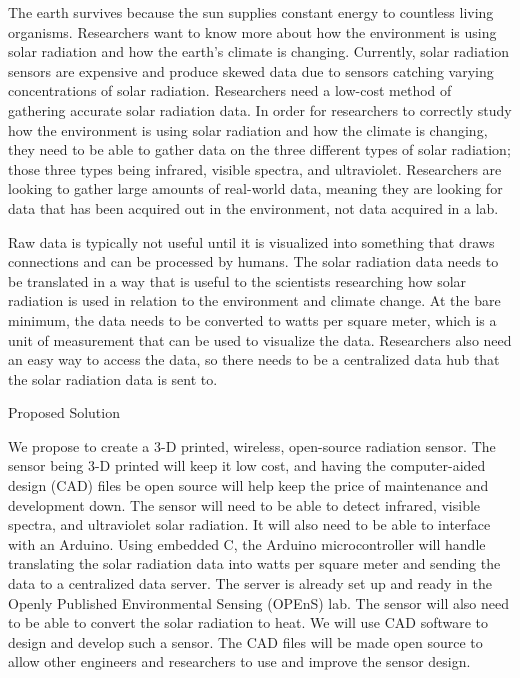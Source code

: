 \documentclass[10pt,draftclsnofoot,onecolumn,letterpaper]{article}
\begin{document}
    {\fontsize{10pt}{12.0pt}\selectfont The earth survives because the sun supplies constant energy to countless living organisms. Researchers want to know more about how the environment is using solar radiation and how the earth’s climate is changing. Currently, solar radiation sensors are expensive and produce skewed data due to sensors catching varying concentrations of solar radiation. Researchers need a low-cost method of gathering accurate solar radiation data. In order for researchers to correctly study how the environment is using solar radiation and how the climate is changing, they need to be able to gather data on the three different types of solar radiation; those three types being infrared, visible spectra, and ultraviolet. Researchers are looking to gather large amounts of real-world data, meaning they are looking for data that has been acquired out in the environment, not data acquired in a lab.\par}\par
    
    {\fontsize{10pt}{12.0pt}\selectfont Raw data is typically not useful until it is visualized into something that draws connections and can be processed by humans. The solar radiation data needs to be translated in a way that is useful to the scientists researching how solar radiation is used in relation to the environment and climate change. At the bare minimum, the data needs to be converted to watts per square meter, which is a unit of measurement that can be used to visualize the data. Researchers also need an easy way to access the data, so there needs to be a centralized data hub that the solar radiation data is sent to.\par}\par
    
    \begin{Center}
    {\fontsize{14pt}{16.8pt}\selectfont Proposed Solution\par}
    \end{Center}\par
    
    {\fontsize{10pt}{12.0pt}\selectfont We propose to create a 3-D printed, wireless, open-source radiation sensor. The sensor being 3-D printed will keep it low cost, and having the computer-aided design (CAD) files be open source will help keep the price of maintenance and development down. The sensor will need to be able to detect infrared, visible spectra, and ultraviolet solar radiation. It will also need to be able to interface with an Arduino. Using embedded C, the Arduino microcontroller will handle translating the solar radiation data into watts per square meter and sending the data to a centralized data server. The server is already set up and ready in the Openly Published Environmental Sensing (OPEnS) lab. The sensor will also need to be able to convert the solar radiation to heat. We will use CAD software to design and develop such a sensor. The CAD files will be made open source to allow other engineers and researchers to use and improve the sensor design.\par}\par
    
\end{document}
